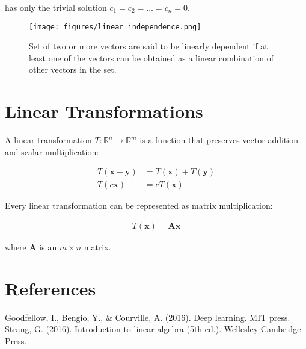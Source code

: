 \documentclass[12pt]{article}
\begin{document}
has only the trivial solution $c_1 = c_2 = \dots = c_n = 0$.

\begin{figure}[h]
\centering
\texttt{[image: figures/linear\_independence.png]}
\caption{Set of two or more vectors are said to be linearly dependent if at least one of the vectors can be obtained as a linear combination of other vectors in the set.}
\label{fig:linear_independence}
\end{figure}

\section{Linear Transformations}

A linear transformation $T: \mathbb{R}^n \rightarrow \mathbb{R}^m$ is a function that preserves vector addition and scalar multiplication:

\begin{align}
T(\mathbf{x} + \mathbf{y}) &= T(\mathbf{x}) + T(\mathbf{y}) \\
T(c\mathbf{x}) &= cT(\mathbf{x})
\end{align}

Every linear transformation can be represented as matrix multiplication:

\begin{align}
T(\mathbf{x}) = \mathbf{A}\mathbf{x}
\end{align}

where $\mathbf{A}$ is an $m \times n$ matrix.

\section{References}

\begin{thebibliography}{9}
 Goodfellow, I., Bengio, Y., \& Courville, A. (2016). Deep learning. MIT press.
 Strang, G. (2016). Introduction to linear algebra (5th ed.). Wellesley-Cambridge Press.
\end{thebibliography}
\end{document}
